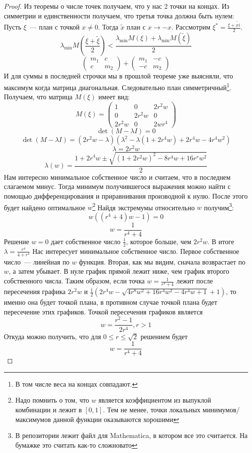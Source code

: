  \begin{proof}
Из теоремы о числе точек получаем, что у нас 2 точки на концах. Из симметрии и единственности получаем, что третья точка должна быть нулем:
Пусть $\xi$ — план с точкой $x \neq 0$. Тогда $\tilde{x}$ план с $x\rightarrow -x$. Рассмотрим $\xi^{*} = \frac{\xi+\tilde{xi}}{2}$. 
$$\lambda_{\min}M(\frac{\xi+\tilde{\xi}}{2}) < \frac{\lambda_{\min}M(\xi) + \lambda_{\min} M(\tilde{\xi})}{2}$$
$$ \begin{pmatrix} m_1 & c \\ c & m_2 \end{pmatrix} + \begin{pmatrix} m_1 & -c \\ -c & m_2 \end{pmatrix}$$
И для суммы в последней строчки мы в прошлой теореме уже выясняли, что максимум когда матрица диагональная. 
Следовательно план симметричный\footnote{В том числе веса на концах совпадают.}. Получаем, что матрица $M(\xi)$ имеет вид:
$$M(\xi) = \begin{pmatrix} 1 & 0 & 2r^2w \\ 0 & 2r^2 w & 0 \\ 2r^2w & 0 & 2wr^4 \end{pmatrix}$$
$$\det (M - \lambda I) = 0$$
$$\det(M-\lambda I) = \left(2r^2 w - \lambda\right)\left(\lambda^2 - \lambda(1 + 2r^4 w)+2r^4w - 4r^4w^2\right)$$
$$\lambda = 2r^2 w$$
$$\lambda(w) = \frac{1 + 2r^4w ± \sqrt{(1+2r^2w)^2 - 8r^4w + 16r^rw^2}}{2}$$
Нам интересно минимальное собственное число и считаем, что в последнем слагаемом минус. Тогда минимум получившегося выражения можно найти с помощью дифференцирования и приравнивания производной к нулю. После этого будет найдено оптимальное $w$\footnote{Надо помнить о том, что $w$ является коэффициентом из выпуклой комбинации и лежит в $[0,1]$. Тем не менее, точки локальных минимумов/максимумов данной функции оказываются хорошими}
Найдя экстремумы относительно $w$ получим\footnote{В репозитории лежит файл для Mathematica, в котором все это считается. На бумажке это считать как-то сложновато}:
$$ w((r^4+4)w - 1) = 0$$
$$w = \frac{1}{r^4 + 4}$$
Решение $w=0$ дает собственное число $\frac{1}{2}$, которое больше, чем $2r^2w$.  
В итоге 
$\lambda = \frac{r^4}{4+r^4}$
Нас интересует минимальное собственное число. Первое собственное число — линейная по $w$ функция. Вторая, как мы видим, сначала возврастает по $w$, а затем убывает. В нуле график прямой лежит ниже, чем график второго собственного числа. Таким образом, если точка $w=\frac{1}{r^4 + 4}$ лежит после пересечения графика $2r^2w$ и 
$\frac{1}{2} \left(2 r^4 w-\sqrt{4 r^8 w^2+16 r^4 w^2-4 r^4 w+1}+1\right)$, то именно она будет точкой плана, в противном случае точкой плана будет пересечение этих графиков.
Точкой пересечения графиков является
$$w=\frac{r^2-1}{2 r^4}, r > 1$$
Откуда можно получить, что для $0 \leq r \leq \sqrt{2}$ решением будет 
$$w=\frac{1}{r^4 + 4}$$
 \end{proof}



